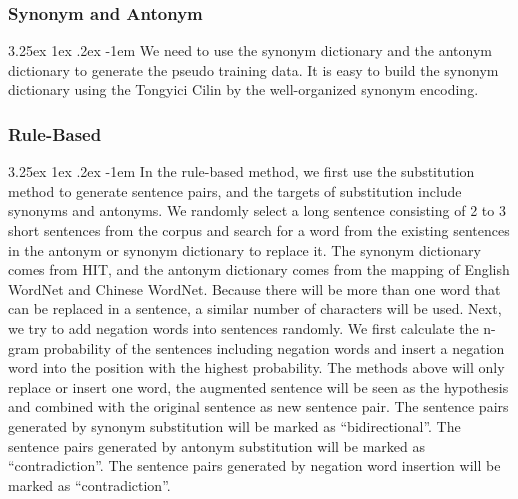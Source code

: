 \documentclass[12pt]{article}
\makeatletter
\renewcommand\paragraph{\@startsection{paragraph}{5}{\z@}%
  {3.25ex \@plus1ex \@minus.2ex}%
  {-1em}%
  {\normalfont\normalsize\bfseries}}
\makeatother
\begin{document}
\begin{CJK*}{UTF8}{bkai}
\begin{spacing}{1.77}
\subsubsection{Synonym and Antonym}
\paragraph{}
We need to use the synonym dictionary and the antonym dictionary to generate the pseudo training data. It is easy to build the synonym dictionary using the Tongyici Cilin by the well-organized synonym encoding.

\subsubsection{Rule-Based}
\paragraph{}
In the rule-based method, we first use the substitution method to generate sentence pairs, and the targets of substitution include synonyms and antonyms. We randomly select a long sentence consisting of 2 to 3 short sentences from the corpus and search for a word from the existing sentences in the antonym or synonym dictionary to replace it. The synonym dictionary comes from HIT, and the antonym dictionary comes from the mapping of English WordNet and Chinese WordNet. Because there will be more than one word that can be replaced in a sentence, a similar number of characters will be used. Next, we try to add negation words into sentences randomly. We first calculate the n-gram probability of the sentences including negation words and insert a negation word into the position with the highest probability. The methods above will only replace or insert one word, the augmented sentence will be seen as the hypothesis and combined with the original sentence as new sentence pair. The sentence pairs generated by synonym substitution will be marked as ``bidirectional''. The sentence pairs generated by antonym substitution will be marked as ``contradiction''. The sentence pairs generated by negation word insertion will be marked as ``contradiction''.


\end{spacing}
\end{CJK*}
\end{document}
